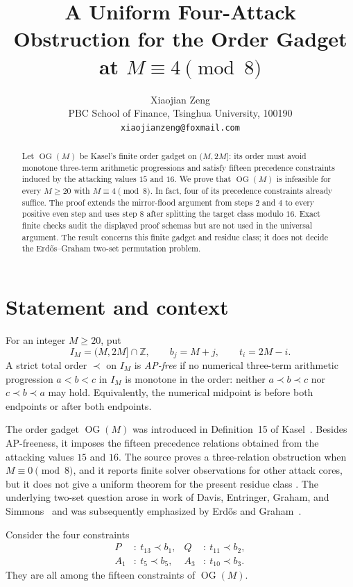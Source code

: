 \documentclass[11pt]{article}
\title{A Uniform Four-Attack Obstruction for the Order Gadget\\
at \texorpdfstring{$M\equiv4\pmod 8$}{M = 4 mod 8}}
\author{Xiaojian Zeng\\
PBC School of Finance, Tsinghua University, 100190\\
\texttt{xiaojianzeng@foxmail.com}}
\date{}
\newcommand{\IM}{I_M}
\newcommand{\OG}{\operatorname{OG}}
\begin{document}
\maketitle

\begin{abstract}
Let $\OG(M)$ be Kasel's finite order gadget on $(M,2M]$: its order must
avoid monotone three-term arithmetic progressions and satisfy fifteen
precedence constraints induced by the attacking values $15$ and $16$.
We prove that $\OG(M)$ is infeasible for every $M\geq20$ with
$M\equiv4\pmod 8$.  In fact, four of its precedence constraints already
suffice.  The proof extends the mirror-flood argument from steps $2$ and $4$
to every positive even step and uses step $8$ after splitting the target
class modulo $16$.  Exact finite checks audit the displayed proof schemas but
are not used in the universal argument.  The result concerns this finite
gadget and residue class; it does not decide the Erd\H{o}s--Graham two-set
permutation problem.
\end{abstract}

\section{Statement and context}

For an integer $M\geq20$, put
\[
  \IM=(M,2M]\cap\mathbb Z,
  \qquad b_j=M+j,
  \qquad t_i=2M-i.
\]
A strict total order $\prec$ on $\IM$ is \emph{AP-free} if no numerical
three-term arithmetic progression $a<b<c$ in $\IM$ is monotone in the order:
neither $a\prec b\prec c$ nor $c\prec b\prec a$ may hold.  Equivalently, the
numerical midpoint is before both endpoints or after both endpoints.

The order gadget $\OG(M)$ was introduced in Definition~15 of
Kasel~\cite{Kasel2026}.  Besides AP-freeness, it imposes the fifteen
precedence relations obtained from the attacking values $15$ and $16$.
The source proves a three-relation obstruction when $M\equiv0\pmod8$, and it
reports finite solver observations for other attack cores, but it does not
give a uniform theorem for the present residue class
\cite[Proposition~19, Theorem~22, and Remark~30]{Kasel2026}.  The underlying
two-set question arose in work of Davis, Entringer, Graham, and
Simmons~\cite{DavisEtAl1977} and was subsequently emphasized by Erd\H{o}s and
Graham~\cite{ErdosGraham1979}.

Consider the four constraints
\begin{equation}\label{eq:C4}
\begin{aligned}
 P&:\ t_{13}\prec b_1, &
 Q&:\ t_{11}\prec b_2,\\
 A_1&:\ t_5\prec b_5, &
 A_3&:\ t_{10}\prec b_3.
\end{aligned}
\end{equation}
They are all among the fifteen constraints of $\OG(M)$.
\end{document}
